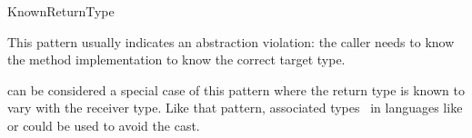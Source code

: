 \begin{pattern}{KnownReturnType}




\discussion{}
This pattern usually indicates an abstraction violation: the caller 
needs to know the method implementation to know the correct target type.

 can be considered a special case of this
pattern where the return type is known to vary with the receiver type.
Like that pattern,
associated types~\cite{chakravartyAssociatedTypeSynonyms2005}
in languages like \haskell{} or \rust{} could be used to avoid the cast.

\end{pattern}
